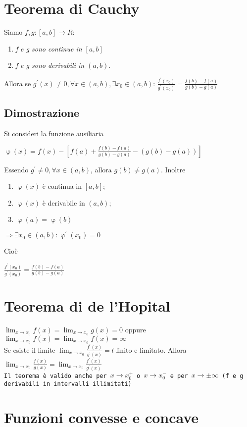 \section{Teorema di Cauchy}
Siamo $f,g:[a,b]\to R$:
\begin{enumerate}
	\item \textit{f e g sono continue in $[a,b]$}
	\item \textit{f e g sono derivabili in $(a,b)$}.
\end{enumerate}
Allora se $g^\prime (x) \neq 0, \forall x \in (a,b), \exists x_0\in(a,b)$:
$\frac{f^\prime (x_0)}{g^\prime (x_0)}=\frac{f(b)-f(a)}{g(b)-g(a)}$
\subsection{Dimostrazione}
Si consideri la funzione ausiliaria
\begin{center}
	$\upvarphi(x)=f(x)-[f(a)+\frac{f(b)-f(a)}{g(b)-g(a)}-(g(b)-g(a))]$
\end{center}
Essendo $g^\prime\neq 0, \forall x \in (a,b)$, allora $g(b)\neq g(a)$. Inoltre
\begin{enumerate}
	\item $\upvarphi(x)$ è continua in $[a,b]$;
	\item $\upvarphi(x)$ è derivabile in $(a,b)$;
	\item $\upvarphi(a)=\upvarphi(b)$
\end{enumerate}
\begin{center}
	$\Rightarrow \exists x_0 \in (a,b):\upvarphi^\prime(x_0)=0$
\end{center}
Cioè
\begin{center}
	$\frac{f^\prime (x_0)}{g^\prime(x_0)}=\frac{f(b)-f(a)}{g(b)-g(a)}$
\end{center}
\section{Teorema di de l'Hopital}
$\lim_{x\to x_0}f(x)=\lim_{x\to x_0}g(x)=0$ oppure $\lim_{x\to
x_0}f(x)=\lim_{x\to x_0}f(x)=\infty$\\
Se esiste il limite $\lim_{x\to x_0}\frac{f^\prime(x)}{g^\prime(x)}=l$ finito e
limitato. Allora $\lim_{x\to x_0}\frac{f(x)}{g(x)}=\lim_{x\to
x_0}\frac{f^\prime(x)}{g^\prime(x)}$\\
\texttt{Il teorema è valido anche per $x\to x_0^+$ o $x\to x_0^-$ e per $x\to
\pm\infty$ (f e g derivabili in intervalli illimitati)}
\section{Funzioni convesse e concave}
